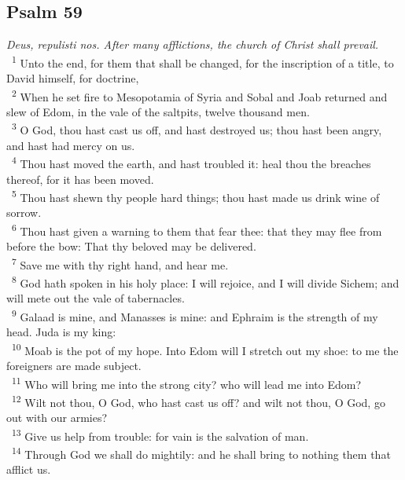 \documentclass[a5paper,12pt]{article}
\begin{document}
\begin{multicols*}{2}
\section{Psalm 59}
\label{sec:org9ac0406}
\emph{Deus, repulisti nos. After many afflictions, the church of Christ shall prevail.}\\

~\textsuperscript{1} Unto the end, for them that shall be changed, for the inscription of a title, to David himself, for doctrine,\\
~\textsuperscript{2} When he set fire to Mesopotamia of Syria and Sobal and Joab returned and slew of Edom, in the vale of the saltpits, twelve thousand men.\\
~\textsuperscript{3} O God, thou hast cast us off, and hast destroyed us; thou hast been angry, and hast had mercy on us.\\
~\textsuperscript{4} Thou hast moved the earth, and hast troubled it: heal thou the breaches thereof, for it has been moved.\\
~\textsuperscript{5} Thou hast shewn thy people hard things; thou hast made us drink wine of sorrow.\\
~\textsuperscript{6} Thou hast given a warning to them that fear thee: that they may flee from before the bow: That thy beloved may be delivered.\\
~\textsuperscript{7} Save me with thy right hand, and hear me.\\
~\textsuperscript{8} God hath spoken in his holy place: I will rejoice, and I will divide Sichem; and will mete out the vale of tabernacles.\\
~\textsuperscript{9} Galaad is mine, and Manasses is mine: and Ephraim is the strength of my head. Juda is my king:\\
~\textsuperscript{10} Moab is the pot of my hope. Into Edom will I stretch out my shoe: to me the foreigners are made subject.\\
~\textsuperscript{11} Who will bring me into the strong city? who will lead me into Edom?\\
~\textsuperscript{12} Wilt not thou, O God, who hast cast us off? and wilt not thou, O God, go out with our armies?\\
~\textsuperscript{13} Give us help from trouble: for vain is the salvation of man.\\
~\textsuperscript{14} Through God we shall do mightily: and he shall bring to nothing them that afflict us.\\


\end{multicols*}
\end{document}
